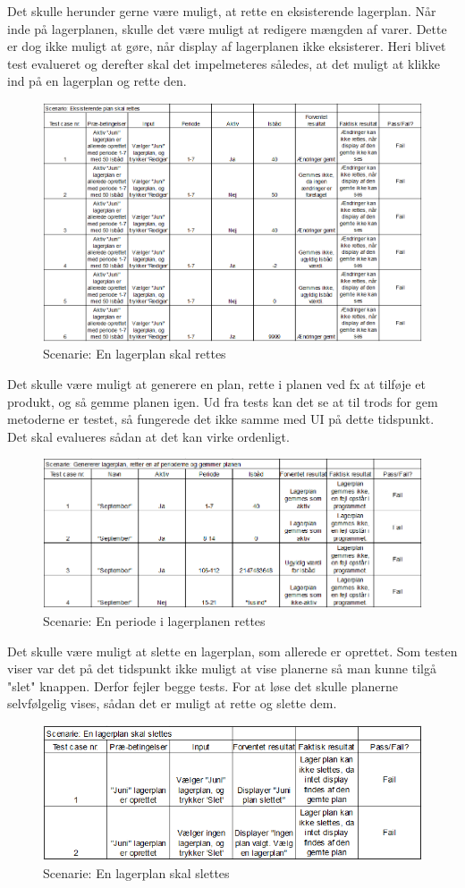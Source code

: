 Det skulle herunder gerne være muligt, at rette en eksisterende lagerplan. Når inde på lagerplanen, skulle det være muligt at redigere mængden af varer. Dette er dog ikke muligt at gøre, når display af lagerplanen ikke eksisterer. Heri blivet test evalueret og derefter skal det impelmeteres således, at det muligt at klikke ind på en lagerplan og rette den. 

\begin{figure}[p]
    \centering
    \includegraphics[width=0.8\hsize]{figures/tests/edit_existing_plan.png}
    \caption{Scenarie: En lagerplan skal rettes}
    \label{fig:testedit}
\end{figure}

Det skulle være muligt at generere en plan, rette i planen ved fx at tilføje et produkt, og så gemme planen igen. Ud fra tests kan det se at til trods for gem metoderne er testet, så fungerede det ikke samme med UI på dette tidspunkt. Det skal evalueres sådan at det kan virke ordenligt.
\begin{figure}[p]
    \centering
    \includegraphics[width=0.8\hsize]{figures/tests/test_ret_plan.png}
    \caption{Scenarie: En periode i lagerplanen rettes}
    \label{fig:testeditperiod}
\end{figure}
Det skulle være muligt at slette en lagerplan, som allerede er oprettet. Som testen viser var det på det tidspunkt ikke muligt at vise planerne så man kunne tilgå "slet" knappen. Derfor fejler begge tests. For at løse det skulle planerne selvfølgelig vises, sådan det er muligt at rette og slette dem.

\begin{figure}[p]
    \centering
    \includegraphics[width=0.8\hsize]{figures/tests/test_slet_lagerplan.png}
    \caption{Scenarie: En lagerplan skal slettes}
    \label{fig:testdelete}
\end{figure}





